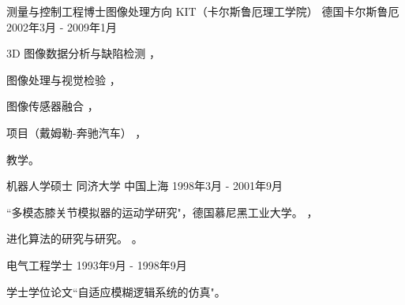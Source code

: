 \documentclass[../resume_xin.tex]{subfiles}
\begin{document}
\begin{cventries}
  \cventry
    {测量与控制工程博士\quad 图像处理方向} %
    {KIT（卡尔斯鲁厄理工学院）} %
    {德国卡尔斯鲁厄} %
    {2002年3月 - 2009年1月} %
    {
      \begin{cvitems} %
        \item 3D 图像数据分析与缺陷检测 \supercite{xin2008diss}，
        \item 图像处理与视觉检验 \supercite{xin2009multiscale}，
        \item 图像传感器融合 \supercite{xin2004bildfolgenauswertung}，
        \item 项目（戴姆勒-奔驰汽车） \supercite{Xin_Daimler_08}，
        \item 教学。
      \end{cvitems}
    }

  \cventry
    {机器人学硕士} %
    {同济大学} %
    {中国上海} %
    {1998年3月 - 2001年9月} %
    {
      \begin{cvitems} %
        \item ``多模态膝关节模拟器的运动学研究"，德国慕尼黑工业大学。 \supercite{xin2002KneeSimulator}，
        \item 进化算法的研究与研究。 \supercite{xin2002AntColony}。
      \end{cvitems}
    }

  \cventry
    {电气工程学士} %
    {} %
    {} %
    {1993年9月 - 1998年9月} %
    {
      \begin{cvitems} %
        \item 学士学位论文``自适应模糊逻辑系统的仿真"。
      \end{cvitems}
    }

\end{cventries}
\end{document}
